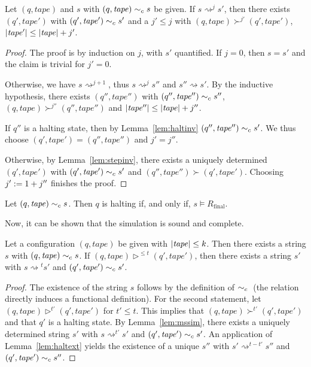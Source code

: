 \documentclass[a4paper,UKenglish,cleveref, autoref]{lipics-v2019}
\newcommand{\strent}{\rightsquigarrow}
\newcommand{\Rfinal}{R_{\text{final}}}
\begin{document}
\begin{lemma}\label{lem:multiinv}
  Let $(q, \mathit{tape})$ and $s$ with $(q, \mathit{tape}) \sim_c{} s$ be given. If $s \strent^{j} s'$, then there exists $(q', \mathit{tape}')$ with $(q', \mathit{tape}') \sim_c{} s'$ and a $j' \le j$ with $(q, \mathit{tape}) \succ^{j'} (q', \mathit{tape}')$, $|\mathit{tape}'| \le |\mathit{tape}| + j'$. 
\end{lemma}
\begin{proof}
  The proof is by induction on $j$, with $s'$ quantified. 
  If $j = 0$, then $s = s'$ and the claim is trivial for $j' = 0$.

  Otherwise, we have $s \strent^{j+1}$, thus $s \strent^{j} s''$ and $s'' \strent{} s'$. By the inductive hypothesis, there exists $(q'', \mathit{tape}'')$ with $(q'', \mathit{tape}'') \sim_c{} s''$, $(q, \mathit{tape}) \succ^{j''} (q'', \mathit{tape}'')$ and $|\mathit{tape''}| \le |\mathit{tape}| + j''$. 

  If $q''$ is a halting state, then by Lemma~\ref{lem:haltinv} $(q'', \mathit{tape}'') \sim_c{} s'$. We thus choose $(q', \mathit{tape}') = (q'', \mathit{tape}'')$ and $j' = j''$. 

  Otherwise, by Lemma~\ref{lem:stepinv}, there exists a uniquely determined $(q', \mathit{tape}')$ with $(q', \mathit{tape}') \sim_c{} s'$ and $(q'', \mathit{tape}'') \succ (q', \mathit{tape}')$. 
  Choosing $j' := 1 +{j''}$ finishes the proof.
\end{proof}


\begin{lemma}\label{lem:finalcond}
  Let $(q, \mathit{tape}) \sim_c{} s$. Then $q$ is halting if, and only if, $s \models \Rfinal$. 
\end{lemma}

Now, it can be shown that the simulation is sound and complete.

\begin{theorem}[Completeness]\label{thm:simcomplete}
  Let a configuration $(q, \mathit{tape})$ be given with $|\mathit{tape}| \le k$. Then there exists a string $s$ with $(q, \mathit{tape}) \sim_c{} s$. If $(q, \mathit{tape}) \rhd^{\le t} (q', \mathit{tape}')$, then there exists a string $s'$ with $s \strent{}^t s'$ and $(q', \mathit{tape}') \sim_c{} s'$.  
\end{theorem}
\begin{proof}
  The existence of the string $s$ follows by the definition of $\sim_c{}$ (the relation directly induces a functional definition).  
  For the second statement, let $(q, \mathit{tape}) \rhd^{t'} (q', \mathit{tape}')$ for $t' \le t$. 
  This implies that $(q, \mathit{tape}) \succ^{t'} (q', \mathit{tape}')$ and that $q'$ is a halting state. 
  By Lemma~\ref{lem:mssim}, there exists a uniquely determined string $s'$ with $s \strent^{t'} s'$ and $(q', \mathit{tape}') \sim_c{} s'$. An application of Lemma~\ref{lem:haltext} yields the existence of a unique $s''$ with $s' \strent^{t - t'} s''$ and $(q', \mathit{tape}') \sim_c{} s''$.
\end{proof}
\end{document}
